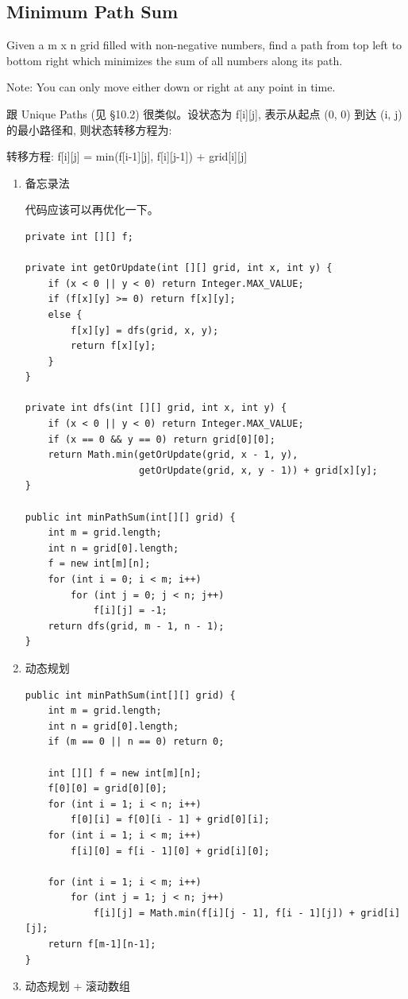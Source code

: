 \documentclass[12pt]{book}
\begin{document}
\subsection{Minimum Path Sum}
\label{sec-14-2-3}
Given a m x n grid filled with non-negative numbers, find a path from top left to bottom right which minimizes the sum of all numbers along its path.

Note: You can only move either down or right at any point in time.

跟 Unique Paths (见 §10.2) 很类似。设状态为 f[i][j], 表示从起点 (0, 0) 到达 (i, j) 的最小路径和, 则状态转移方程为: 

转移方程: f[i][j] = min(f[i-1][j], f[i][j-1]) + grid[i][j]
\begin{enumerate}
\item 备忘录法
\label{sec-14-2-3-1}

代码应该可以再优化一下。
\lstset{language=java,label= ,caption= ,numbers=none}
\begin{lstlisting}
private int [][] f;

private int getOrUpdate(int [][] grid, int x, int y) {
    if (x < 0 || y < 0) return Integer.MAX_VALUE;
    if (f[x][y] >= 0) return f[x][y];
    else {
        f[x][y] = dfs(grid, x, y);
        return f[x][y];
    }
}

private int dfs(int [][] grid, int x, int y) {
    if (x < 0 || y < 0) return Integer.MAX_VALUE;
    if (x == 0 && y == 0) return grid[0][0];
    return Math.min(getOrUpdate(grid, x - 1, y),
                    getOrUpdate(grid, x, y - 1)) + grid[x][y];
}

public int minPathSum(int[][] grid) {
    int m = grid.length;
    int n = grid[0].length;
    f = new int[m][n];
    for (int i = 0; i < m; i++) 
        for (int j = 0; j < n; j++) 
            f[i][j] = -1;
    return dfs(grid, m - 1, n - 1);
}
\end{lstlisting}
\item 动态规划
\label{sec-14-2-3-2}
\lstset{language=java,label= ,caption= ,numbers=none}
\begin{lstlisting}
public int minPathSum(int[][] grid) {
    int m = grid.length;
    int n = grid[0].length;
    if (m == 0 || n == 0) return 0;

    int [][] f = new int[m][n];
    f[0][0] = grid[0][0];
    for (int i = 1; i < n; i++)
        f[0][i] = f[0][i - 1] + grid[0][i];
    for (int i = 1; i < m; i++)
        f[i][0] = f[i - 1][0] + grid[i][0];

    for (int i = 1; i < m; i++) 
        for (int j = 1; j < n; j++) 
            f[i][j] = Math.min(f[i][j - 1], f[i - 1][j]) + grid[i][j];
    return f[m-1][n-1];
}
\end{lstlisting}
\item 动态规划 + 滚动数组
\label{sec-14-2-3-3}
\end{enumerate}
\end{document}
